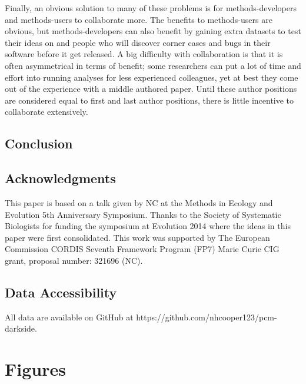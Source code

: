 \documentclass[a4paper,12pt]{article}
\begin{document}
    Finally, an obvious solution to many of these problems is for methods-developers and methods-users to collaborate more. 
    The benefits to methods-users are obvious, but methods-developers can also benefit by gaining extra datasets to test their ideas on and people who will discover corner cases and bugs in their software before it get released. 
    A big difficulty with collaboration is that it is often asymmetrical in terms of benefit; some researchers can put a lot of time and effort into running analyses for less experienced colleagues, yet at best they come out of the experience with a middle authored paper. 
    Until these author positions are considered equal to first and last author positions, there is little incentive to collaborate extensively.

  \subsection{Conclusion}


\subsection{Acknowledgments}
This paper is based on a talk given by NC at the Methods in Ecology and Evolution 5th Anniversary Symposium.
Thanks to the Society of Systematic Biologists for funding the symposium at Evolution 2014 where the ideas in this paper were first consolidated. 
This work was supported by The European Commission CORDIS Seventh Framework Program (FP7) Marie Curie CIG grant, proposal number: 321696 (NC).

\subsection{Data Accessibility}
All data are available on GitHub at https://github.com/nhcooper123/pcm-darkside.




\newpage
\section{Figures}
\end{document}
